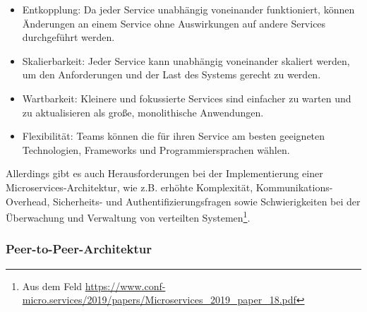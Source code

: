 \begin{itemize}
\item Entkopplung: Da jeder Service unabhängig voneinander funktioniert, können Änderungen an einem Service ohne Auswirkungen auf andere Services durchgeführt werden.
\item Skalierbarkeit: Jeder Service kann unabhängig voneinander skaliert werden, um den Anforderungen und der Last des Systems gerecht zu werden.
\item Wartbarkeit: Kleinere und fokussierte Services sind einfacher zu warten und zu aktualisieren als große, monolithische Anwendungen.
\item Flexibilität: Teams können die für ihren Service am besten geeigneten Technologien, Frameworks und Programmiersprachen wählen.
\end{itemize}
Allerdings gibt es auch Herausforderungen bei der Implementierung einer Microservices-Architektur, wie z.B. erhöhte Komplexität, Kommunikations-Overhead, Sicherheits- und Authentifizierungsfragen sowie Schwierigkeiten bei der Überwachung und Verwaltung von verteilten Systemen\footnote{Aus dem Feld \url{https://www.conf-micro.services/2019/papers/Microservices_2019_paper_18.pdf}}.

\subsubsection{Peer-to-Peer-Architektur}


